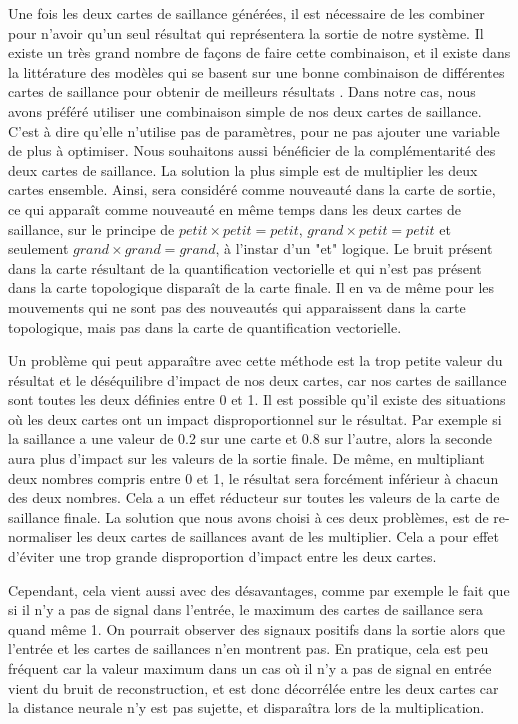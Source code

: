 	Une fois les deux cartes de saillance générées, il est nécessaire de les combiner pour n'avoir qu'un seul résultat qui représentera la sortie de notre système. Il existe un très grand nombre de façons de faire cette combinaison, et il existe dans la littérature des modèles qui se basent sur une bonne combinaison de différentes cartes de saillance pour obtenir de meilleurs résultats \cite{bianco2017combination}. Dans notre cas, nous avons préféré utiliser une combinaison simple de nos deux cartes de saillance. C'est à dire qu'elle n'utilise pas de paramètres, pour ne pas ajouter une variable de plus à optimiser. Nous souhaitons aussi bénéficier de la complémentarité des deux cartes de saillance. La solution la plus simple est de multiplier les deux cartes ensemble. Ainsi, sera considéré comme nouveauté dans la carte de sortie, ce qui apparaît comme nouveauté en même temps dans les deux cartes de saillance, sur le principe de $\textit{petit} \times \textit{petit} = \textit{petit}$, $\textit{grand} \times \textit{petit} = \textit{petit}$ et seulement $\textit{grand} \times \textit{grand} = \textit{grand}$, à l'instar d'un "et" logique. Le bruit présent dans la carte résultant de la quantification vectorielle et qui n'est pas présent dans la carte topologique disparaît de la carte finale. Il en va de même pour les mouvements qui ne sont pas des nouveautés qui apparaissent dans la carte topologique, mais pas dans la carte de quantification vectorielle.

	Un problème qui peut apparaître avec cette méthode est la trop petite valeur du résultat et le déséquilibre d'impact de nos deux cartes, car nos cartes de saillance sont toutes les deux définies entre 0 et 1. Il est possible qu'il existe des situations où les deux cartes ont un impact disproportionnel sur le résultat. Par exemple si la saillance a une valeur de 0.2 sur une carte et 0.8 sur l'autre, alors la seconde aura plus d'impact sur les valeurs de la sortie finale. De même, en multipliant deux nombres compris entre 0 et 1, le résultat sera forcément inférieur à chacun des deux nombres. Cela a un effet réducteur sur toutes les valeurs de la carte de saillance finale. La solution que nous avons choisi à ces deux problèmes, est de re-normaliser les deux cartes de saillances avant de les multiplier. Cela a pour effet d'éviter une trop grande disproportion d'impact entre les deux cartes.
	
	Cependant, cela vient aussi avec des désavantages, comme par exemple le fait que si il n'y a pas de signal dans l'entrée, le maximum des cartes de saillance sera quand même 1. On pourrait observer des signaux positifs dans la sortie alors que l'entrée et les cartes de saillances n'en montrent pas. En pratique, cela est peu fréquent car la valeur maximum dans un cas où il n'y a pas de signal en entrée vient du bruit de reconstruction, et est donc décorrélée entre les deux cartes car la distance neurale n'y est pas sujette, et disparaîtra lors de la multiplication.

